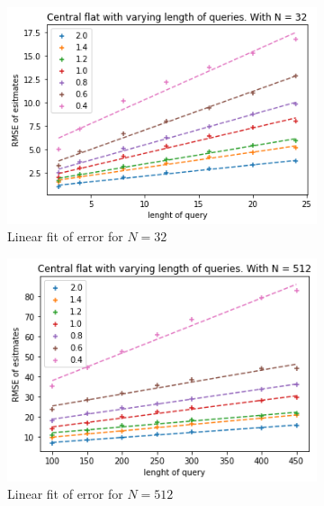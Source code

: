 \documentclass[11pt]{article}
\theoremstyle{definition}
\begin{document}
\begin{figure}[H]
\centering
\begin{subfigure}{.3\textwidth}
  \centering
  \includegraphics[width=\linewidth]{figures/central_flat/varying_r/cen_flat_varying_length_N_linear_=32.png}
  \caption{Linear fit of error for $N=32$}
  \label{fig:cen_r_sub1_lin}
\end{subfigure}%
\begin{subfigure}{.3\textwidth}
  \centering
  \includegraphics[width=\linewidth]{figures/central_flat/varying_r/cen_flat_varying_length_N_linear_=512.png}
  \caption{Linear fit of error for $N=512$}
  \label{fig:cen_r_sub2_lin}
\end{subfigure}
\begin{subfigure}{.3\textwidth}
  \centering

\end{subfigure}
\end{figure}
\end{document}
